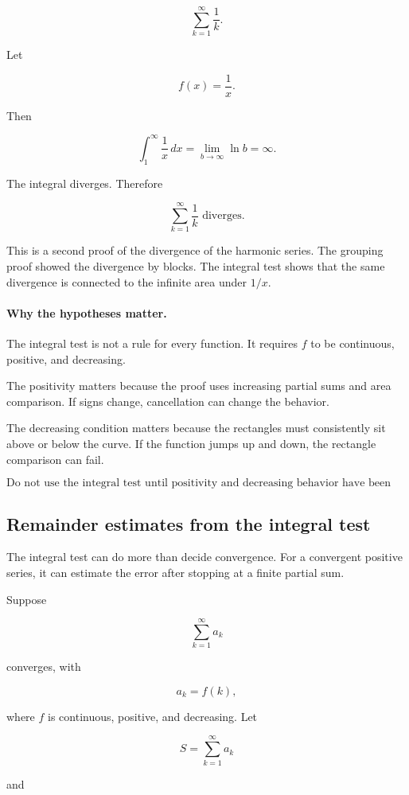 \[
\sum_{k=1}^{\infty}\frac1k.
\]

Let

\[
f(x)=\frac1x.
\]

Then

\[
\int_1^{\infty}\frac1x\,dx
=
\lim_{b\to\infty}\ln b
=
\infty.
\]

The integral diverges.  Therefore

\[
\boxed{
\sum_{k=1}^{\infty}\frac1k \text{ diverges.}
}
\]

This is a second proof of the divergence of the harmonic series.  The grouping proof
showed the divergence by blocks.  The integral test shows that the same divergence is
connected to the infinite area under \(1/x\).

\paragraph{Why the hypotheses matter.}
The integral test is not a rule for every function.  It requires \(f\) to be continuous,
positive, and decreasing.

The positivity matters because the proof uses increasing partial sums and area
comparison.  If signs change, cancellation can change the behavior.

The decreasing condition matters because the rectangles must consistently sit above or
below the curve.  If the function jumps up and down, the rectangle comparison can fail.

\[
\boxed{
\text{Do not use the integral test until positivity and decreasing behavior have been checked.}
}
\]

\subsection{Remainder estimates from the integral test}
\label{subsec:integral-test-remainder-estimates}

The integral test can do more than decide convergence.  For a convergent positive
series, it can estimate the error after stopping at a finite partial sum.

Suppose

\[
\sum_{k=1}^{\infty}a_k
\]

converges, with

\[
a_k=f(k),
\]

where \(f\) is continuous, positive, and decreasing.  Let

\[
S=\sum_{k=1}^{\infty}a_k
\]

and

